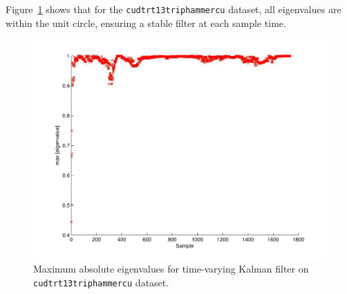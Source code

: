 Figure~\ref{fig:max_eigenvalue} shows that for the \texttt{cudtrt13triphammercu} dataset, all eigenvalues are within the unit circle, ensuring a stable filter at each sample time.

\begin{figure}[!b]
\includegraphics[width=\columnwidth]{eigenvalues}
\caption{Maximum absolute eigenvalues for time-varying Kalman filter on \texttt{cudtrt13triphammercu} dataset.}
\label{fig:max_eigenvalue}
\end{figure}


